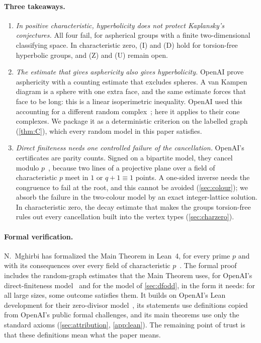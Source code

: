 \documentclass[11pt]{article}
\theoremstyle{definition}
\theoremstyle{plain}
\begin{document}
\paragraph{Three takeaways.}
\begin{enumerate}[label=(\arabic*),itemsep=1pt,topsep=2pt]
\item \emph{In positive characteristic, hyperbolicity does not protect Kaplansky's conjectures.} All four fail, for aspherical groups with a finite two-dimensional classifying space. In characteristic zero, (I) and (D) hold for torsion-free hyperbolic groups, and (Z) and (U) remain open.
\item \emph{The estimate that gives asphericity also gives hyperbolicity.} OpenAI prove asphericity with a counting estimate that excludes spheres. A van Kampen diagram is a sphere with one extra face, and the same estimate forces that face to be long: this is a linear isoperimetric inequality. OpenAI used this accounting for a different random complex~\cite[Thm.~3.1]{OAI257}; here it applies to their cone complexes. We package it as a deterministic criterion on the labelled graph (\cref{thm:C}), which every random model in this paper satisfies.
\item \emph{Direct finiteness needs one controlled failure of the cancellation.} OpenAI's certificates are parity counts. Signed on a bipartite model, they cancel modulo $p$~\cite{Ivanov2026}, because two lines of a projective plane over a field of characteristic $p$ meet in $1$ or $q+1\equiv1$ points. A one-sided inverse needs the congruence to fail at the root, and this cannot be avoided (\cref{sec:colour}); we absorb the failure in the two-colour model by an exact integer-lattice solution. In characteristic zero, the decay estimate that makes the groups torsion-free rules out every cancellation built into the vertex types (\cref{sec:charzero}).
\end{enumerate}

\paragraph{Formal verification.} N.~Mghirbi has formalized the Main Theorem in Lean~4, for every prime $p$ and with its consequences over every field of characteristic $p$~\cite{MghirbiLean}. The formal proof includes the random-graph estimates that the Main Theorem uses, for OpenAI's direct-finiteness model~\cite{OAI197a} and for the model of \cref{sec:dfodd}, in the form it needs: for all large sizes, some outcome satisfies them. It builds on OpenAI's Lean development for their zero-divisor model~\cite{OAIlean}, its statements use definitions copied from OpenAI's public formal challenges, and its main theorems use only the standard axioms (\cref{sec:attribution}, \cref{app:lean}). The remaining point of trust is that these definitions mean what the paper means.
\end{document}
